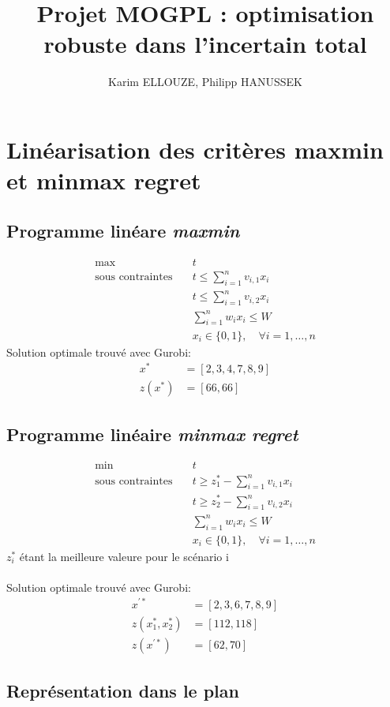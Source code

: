 \documentclass[10pt,a4paper]{report}
\author{Karim ELLOUZE, Philipp HANUSSEK}
\title{Projet MOGPL : optimisation robuste dans l’incertain total}
\begin{document}
\maketitle
\newpage
\chapter{Linéarisation des critères maxmin et minmax regret}
\section{Programme linéare \textit{maxmin}}
\begin{align*}
\max \quad & t \\
\text{sous contraintes} \quad & t \leq \sum_{i=1}^{n} v_{i,1} x_i \\
& t \leq \sum_{i=1}^{n} v_{i,2} x_i \\
& \sum_{i=1}^{n} w_i x_i \leq W \\
& x_i \in \{0, 1\}, \quad \forall i = 1, \ldots, n
\end{align*}
Solution optimale trouvé avec Gurobi:
\begin{align*}
	x^* 	&= [2, 3, 4, 7, 8, 9]\\
	z(x^*) 	&= [66,66]
\end{align*}
\section{Programme linéaire \textit{minmax regret}}
\begin{align*}
\min \quad & t \\
\text{sous contraintes} \quad & t \geq z_1^* - \sum_{i=1}^{n} v_{i,1} x_i \\
& t \geq z_2^* - \sum_{i=1}^{n} v_{i,2} x_i \\
& \sum_{i=1}^{n} w_i x_i \leq W \\
& x_i \in \{0, 1\}, \quad \forall i = 1, \ldots, n
\end{align*}
$z_i^*$ étant la meilleure valeure pour le scénario i\\\\
Solution optimale trouvé avec Gurobi:
\begin{align*}
	x^{'*} 	&= [2, 3, 6, 7, 8, 9]\\
	z(x_1^*,x_2^*) &= [112,118]\\ 
	z(x^{'*}) 	&= [62,70]
\end{align*}
\section{Représentation dans le plan}
\end{document}
